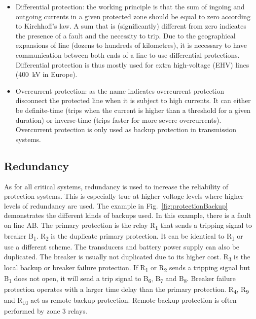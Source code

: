 \begin{itemize}
    \item Differential protection: the working principle is that the sum of ingoing and outgoing currents in a given protected zone should be equal to zero according to Kirchhoff's law. A sum that is (significantly) different from zero indicates the presence of a fault and the necessity to trip. Due to the geographical expansions of line (dozens to hundreds of kilometres), it is necessary to have communication between both ends of a line to use differential protections. Differential protection is thus mostly used for extra high-voltage (EHV) lines (400~kV in Europe).
    
    \item Overcurrent protection: as the name indicates overcurrent protection disconnect the protected line when it is subject to high currents. It can either be definite-time (trips when the current is higher than a threshold for a given duration) or inverse-time (trips faster for more severe overcurrents). Overcurrent protection is only used as backup protection in transmission systems.
\end{itemize}

\subsection{Redundancy}

As for all critical systems, redundancy is used to increase the reliability of protection systems. This is especially true at higher voltage levels where higher levels of redundancy are used. The example in Fig.~\ref{fig:protectionBackup} demonstrates the different kinds of backups used. In this example, there is a fault on line AB. The primary protection is the relay R\textsubscript{1} that sends a tripping signal to breaker B\textsubscript{1}. R\textsubscript{2} is the duplicate primary protection. It can be identical to R\textsubscript{1} or use a different scheme. The transducers and battery power supply can also be duplicated. The breaker is usually not duplicated due to its higher cost. R\textsubscript{3} is the local backup or breaker failure protection. If R\textsubscript{1} or R\textsubscript{2} sends a tripping signal but B\textsubscript{1} does not open, it will send a trip signal to B\textsubscript{6}, B\textsubscript{7} and B\textsubscript{8}. Breaker failure protection operates with a larger time delay than the primary protection. R\textsubscript{4}, R\textsubscript{9} and R\textsubscript{10} act as remote backup protection. Remote backup protection is often performed by zone 3 relays.

